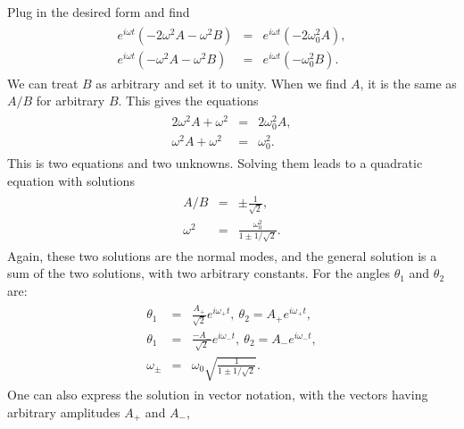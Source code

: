 \documentclass[letterpaper,10pt,english]{sphinxmanual}
\begin{document}
Plug in the desired form and find
\begin{equation*}
\begin{split}
\begin{eqnarray*}
e^{i\omega t}(-2\omega^2A-\omega^2B)&=&e^{i\omega t}(-2\omega_0^2A),\\
e^{i\omega t}(-\omega^2A-\omega^2B)&=&e^{i\omega t}(-\omega_0^2B).
\end{eqnarray*}
\end{split}
\end{equation*}
We can treat \(B\) as arbitrary and set it to unity. When we find \(A\),
it is the same as \(A/B\) for arbitrary \(B\). This gives the equations
\begin{equation*}
\begin{split}
\begin{eqnarray*}
2\omega^2A+\omega^2&=&2\omega_0^2A,\\
\omega^2A+\omega^2&=&\omega_0^2.
\end{eqnarray*}
\end{split}
\end{equation*}
This is two equations and two unknowns. Solving them leads to a
quadratic equation with solutions
\begin{equation*}
\begin{split}
\begin{eqnarray*}
A/B&=&\pm\frac{1}{\sqrt{2}},\\
\omega^2&=&\frac{\omega_0^2}{1\pm 1/\sqrt{2}}.
\end{eqnarray*}
\end{split}
\end{equation*}
Again, these two solutions are the normal modes, and the general
solution is a sum of the two solutions, with two arbitrary
constants. For the angles \(\theta_1\) and \(\theta_2\) are:
\begin{equation*}
\begin{split}
\begin{eqnarray*}
\theta_1&=&\frac{A_+}{\sqrt{2}}e^{i\omega_+t}, ~\theta_2=A_+e^{i\omega_+t},\\
\theta_1&=&\frac{-A_-}{\sqrt{2}}e^{i\omega_-t}, ~\theta_2=A_-e^{i\omega_-t},\\
\omega_{\pm}&=&\omega_0\sqrt{\frac{1}{1\pm 1/\sqrt{2}}}.
\end{eqnarray*}
\end{split}
\end{equation*}
One can also express the solution in vector notation, with the vectors
having arbitrary amplitudes \(A_+\) and \(A_-\),
\end{document}
